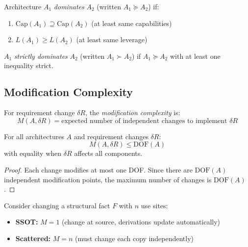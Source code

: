\begin{definition}\label{def:dominance}
Architecture $A_1$ \emph{dominates} $A_2$ (written $A_1 \succeq A_2$) if:
\begin{enumerate}
\item $\text{Cap}(A_1) \supseteq \text{Cap}(A_2)$ (at least same capabilities)
\item $L(A_1) \geq L(A_2)$ (at least same leverage)
\end{enumerate}

$A_1$ \emph{strictly dominates} $A_2$ (written $A_1 \succ A_2$) if $A_1 \succeq A_2$ with at least one inequality strict.
\end{definition}

\subsection{Modification Complexity}

\begin{definition}\label{def:mod-complexity}
For requirement change $\delta R$, the \emph{modification complexity} is:
\[
M(A, \delta R) = \text{expected number of independent changes to implement } \delta R
\]
\end{definition}

\begin{theorem}\label{thm:mod-bound}
For all architectures $A$ and requirement changes $\delta R$:
\[
M(A, \delta R) \leq \text{DOF}(A)
\]
with equality when $\delta R$ affects all components.
\end{theorem}

\begin{proof}
Each change modifies at most one DOF. Since there are $\text{DOF}(A)$ independent modification points, the maximum number of changes is $\text{DOF}(A)$.
\end{proof}

\begin{example}
Consider changing a structural fact $F$ with $n$ use sites:
\begin{itemize}
\item \textbf{SSOT:} $M = 1$ (change at source, derivations update automatically)
\item \textbf{Scattered:} $M = n$ (must change each copy independently)
\end{itemize}
\end{example}

